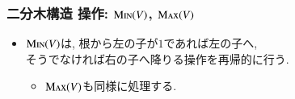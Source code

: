 \documentclass[main]{subfiles}
\begin{document}
\begin{frame}\frametitle{二分木構造 操作: $\mathrm{\text{M\textsc{in}}}(V)$, $\mathrm{\text{M\textsc{ax}}}(V)$}
\begin{itemize}
\item $\mathrm{\text{M\textsc{in}}}(V)$は, 根から左の子が$1$であれば左の子へ, \\そうでなければ右の子へ降りる操作を再帰的に行う.
\begin{itemize}
	\item $\mathrm{\text{M\textsc{ax}}}(V)$も同様に処理する.
\end{itemize}
\end{itemize}


\end{frame}
\end{document}
